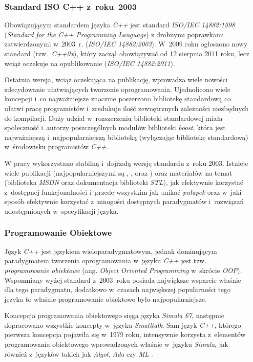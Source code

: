       \subsubsection{Standard ISO C++ z~roku~2003}
      Obowiązującym standardem języka \textit{C++} jest standard \textit{ISO/IEC 14882:1998} (\textit{Standard for the C++ Programming Language}) z drobnymi poprawkami zatwierdzonymi w~2003~r. (\textit{ISO/IEC 14882:2003}). W~2009 roku ogłoszono nowy standard (tzw.~\textit{C++0x}), który zaczął obowiązywać od 12 sierpnia 2011 roku, lecz wciąż oczekuje na opublikowanie (\textit{ISO/IEC 14882:2011}).

      Ostatnia wersja, wciąż oczekująca na publikację, wprowadza wiele nowości zdecydowanie ułatwiających tworzenie oprogramowania. Ujednolicono wiele koncepcji i~co najważniejsze znacznie poszerzono bibliotekę standardową co ułatwi pracę programistów i~zredukuje ilość zewnętrznych zależności niezbędnych do kompilacji. Duży udział w~rozszerzeniu biblioteki standardowej miała społeczność i~autorzy poszczególnych modułów biblioteki \textit{boost}, która jest najważniejszą i~najpopularniejszą biblioteką (wyłączając bibliotekę standardową) w~środowisku programistów \textit{C++}.

      W pracy wykorzystano stabilną i~dojrzałą wersję standardu z~roku 2003. Istnieje wiele publikacji (najpopularniejszymi są \cite{EffectiveCpp}, \cite{MoreEffectiveCpp}, \cite{EffectiveStl} oraz \cite{Alexandrescu}) oraz materiałów na temat (biblioteka \textit{MSDN} oraz dokumentacja biblioteki \textit{STL}), jak efektywnie korzystać z~dostępnej funkcjonalności i~przede wszystkim jak unikać \textit{pułapek} oraz w~jaki sposób efektywnie korzystać z~mnogości dostępnych paradygmatów i~rozwiązań udostępnionych w~specyfikacji języka.

      \subsubsection{Programowanie Obiektowe}
      Język \textit{C++} jest językiem wieloparadygmatowym, jednak dominującym paradygmatem tworzenia oprogramowania w~języku \textit{C++} jest tzw. \textit{programowanie obiektowe} (ang. \textit{Object Oriented Programming} w~skrócie \textit{OOP}). Wspomniany wyżej standard z~2003~roku posiada największe wsparcie właśnie dla tego paradygmatu, dodatkowo w~czasach największej popularności tego języka to właśnie programowanie obiektowe było najpopularniejsze.

      Koncepcja programowania obiektowego sięga języka \textit{Simula 67}, następnie dopracowano wszystkie koncepty w~języku \textit{Smalltalk}. Sam język \textit{C++}, którego pierwsza koncepcja pojawiła się w~1979 roku, intensywnie korzysta z~elementów programowania obiektowego wprowadzonych właśnie w~języku \textit{Simula}, jak również z~języków takich jak \textit{Algol}, \textit{Ada} czy \textit{ML} \cite{CppStroustrup}.

